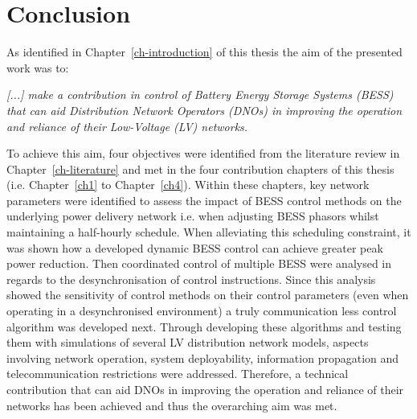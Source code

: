 \section{Conclusion}
\label{ch-conclusions:sec:conclusion}

As identified in Chapter~\ref{ch-introduction} of this thesis the aim of the presented work was to:

\textit{[...] make a contribution in control of Battery Energy Storage Systems (BESS) that can aid Distribution Network Operators (DNOs) in improving the operation and reliance of their Low-Voltage (LV) networks.}

To achieve this aim, four objectives were identified from the literature review in Chapter~\ref{ch-literature} and met in the four contribution chapters of this thesis (i.e. Chapter~\ref{ch1} to Chapter~\ref{ch4}).
Within these chapters, key network parameters were identified to assess the impact of BESS control methods on the underlying power delivery network i.e. when adjusting BESS phasors whilst maintaining a half-hourly schedule.
When alleviating this scheduling constraint, it was shown how a developed dynamic BESS control can achieve greater peak power reduction.
Then coordinated control of multiple BESS were analysed in regards to the desynchronisation of control instructions.
Since this analysis showed the sensitivity of control methods on their control parameters (even when operating in a desynchronised environment) a truly communication less control algorithm was developed next.
Through developing these algorithms and testing them with simulations of several LV distribution network models, aspects involving network operation, system deployability, information propagation and telecommunication restrictions were addressed.
Therefore, a technical contribution that can aid DNOs in improving the operation and reliance of their networks has been achieved and thus the overarching aim was met.

